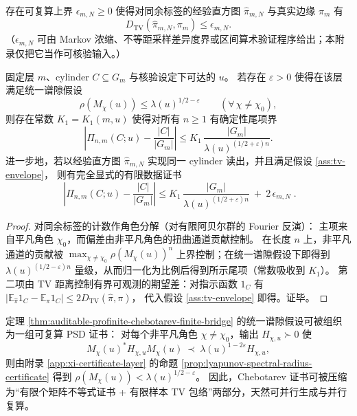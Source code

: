 \begin{assumption}[有限样本的 TV 包络]\label{ass:tv-envelope}
存在可复算上界 $\epsilon_{m,N}\ge 0$ 使得对同余标签的经验直方图 $\hat{\pi}_{m,N}$ 与真实边缘 $\pi_m$ 有
$$
D_{\mathrm{TV}}(\hat{\pi}_{m,N},\pi_m)\le \epsilon_{m,N}.
$$
（$\epsilon_{m,N}$ 可由 Markov 浓缩、不等距采样差异度界或区间算术验证程序给出；本附录仅把它当作可核验输入。）
\end{assumption}

\begin{theorem}\label{thm:auditable-profinite-chebotarev-finite-bridge}
固定层 $m$、cylinder $C\subseteq G_m$ 与核验设定下可达的 $u$。
若存在 $\varepsilon>0$ 使得在该层满足统一谱隙假设
$$
\rho(M_{\chi}(u))\le \lambda(u)^{1/2-\varepsilon}\qquad(\forall\,\chi\neq\chi_0),
$$
则存在常数 $K_1=K_1(m,u)$ 使得对所有 $n\ge 1$ 有确定性尾项界
$$
\left|\Pi_{n,m}(C;u)-\frac{|C|}{|G_m|}\right|
\le
K_1\,\frac{|G_m|}{\lambda(u)^{(1/2+\varepsilon)n}}.
$$
进一步地，若以经验直方图 $\hat{\pi}_{m,N}$ 实现同一 cylinder 读出，并且满足假设 \ref{ass:tv-envelope}，
则有完全显式的有限数据证书
$$
\boxed{\;
\left|\Pi_{n,m}(C;u)-\frac{|C|}{|G_m|}\right|
\le
K_1\,\frac{|G_m|}{\lambda(u)^{(1/2+\varepsilon)n}}
\ +\ 2\,\epsilon_{m,N}\; }.
$$
\end{theorem}

\begin{proof}
对同余标签的计数作角色分解（对有限阿贝尔群的 Fourier 反演）：
主项来自平凡角色 $\chi_0$，而偏差由非平凡角色的扭曲通道贡献控制。
在长度 $n$ 上，非平凡通道的贡献被 $\max_{\chi\neq\chi_0}\rho(M_\chi(u))^{n}$ 上界控制；在统一谱隙假设下即得到 $\lambda(u)^{(1/2-\varepsilon)n}$ 量级，从而归一化为比例后得到所示尾项（常数吸收到 $K_1$）。
第二项由 TV 距离控制有界可观测的期望差：对指示函数 $1_C$ 有
$
|\mathbb{E}_{\hat{\pi}}1_C-\mathbb{E}_{\pi}1_C|\le 2D_{\mathrm{TV}}(\hat{\pi},\pi)
$，
代入假设 \ref{ass:tv-envelope} 即得。证毕。
\end{proof}

\begin{remark}\label{rem:chebotarev-lyapunov}
定理 \ref{thm:auditable-profinite-chebotarev-finite-bridge} 的统一谱隙假设可被组织为一组可复算 PSD 证书：
对每个非平凡角色 $\chi\neq\chi_0$，输出 $H_{\chi,u}\succ 0$ 使
$$
M_{\chi}(u)^\ast H_{\chi,u} M_{\chi}(u)\ \prec\ \lambda(u)^{1-2\varepsilon}H_{\chi,u},
$$
则由附录 \ref{app:xi-certificate-layer} 的命题 \ref{prop:lyapunov-spectral-radius-certificate} 得到
$
\rho(M_\chi(u))<\lambda(u)^{1/2-\varepsilon}
$。
因此，Chebotarev 证书可被压缩为“有限个矩阵不等式证书 + 有限样本 TV 包络”两部分，天然可并行生成与并行复算。
\end{remark}

